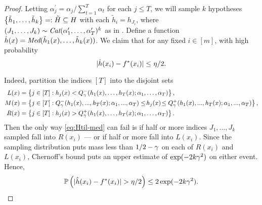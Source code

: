 \begin{proof}
Letting $\alpha_{j}^{\prime} = \alpha_{j} / \sum_{t=1}^{T} \alpha_{t}$ for each $j \leq T$, 
we will sample $k$ hypotheses $\left\{ \tilde h_1,\ldots,\tilde h_k \right\}=:\tilde H\subseteq H$ 
with each $\tilde{h}_{i} = h_{J_{i}}$, where $(J_{1},\ldots,J_{k}) \sim \emph{Cat}(\alpha_{1}^{\prime},\ldots,\alpha_{T}^{\prime})^{k}$ as in .
Define a function $\hat{h}(x) = \emph{Med}(\tilde{h}_{1}(x),\ldots,\tilde{h}_{k}(x))$.  %
We claim that for any fixed $i\in[m]$,
with high probability
\begin{equation}
  \label{eq:Htil-med}
|\hat{h}(x_i)-f^*(x_i)|\le\dev/2.
\end{equation}
\begin{sloppypar}
Indeed,
partition the indices $[T]$ into the disjoint sets
\begin{align*}
L(x) &= \left\{  j \in[ T] : h_{j}(x) < Q_{\gamma}^{-}(h_{1}(x),\ldots,h_{T}(x);\alpha_{1},\ldots,\alpha_{T})  \right\},\\
M(x) &= \left\{  j \in[ T] : Q_{\gamma}^{-}(h_{1}(x),...,h_{T}(x);\alpha_{1},...,\alpha_{T}) \leq\! h_{j}(x) \!\leq Q_{\gamma}^{+}(h_{1}(x),...,h_{T}(x);\alpha_{1},...,\alpha_{T})  \right\},\\
R(x) &= \left\{  j \in[ T] : h_{j}(x) > Q_{\gamma}^{+}(h_{1}(x),\ldots,h_{T}(x);\alpha_{1},\ldots,\alpha_{T})  \right\}.
\end{align*}
Then %
the only way
\eqref{eq:Htil-med}
can fail is if half or more indices %
$J_{1},\ldots,J_{k}$ sampled fall into $R(x_i)$ --- or if half or more fall into $L(x_i)$.
Since the sampling distribution puts mass less than $1/2-\gamma$ 
on each of $R(x_i)$ and $L(x_i)$, 
Chernoff's bound puts an upper estimate of
$\exp(-2k\gamma^2)$ on either event.
Hence,
\begin{equation}
  \label{eq:Htil-med-prob}
  \mathbb{P}\paren{|\hat{h}(x_i)-f^*(x_i)|>\dev/2}
  \le2\exp(-2k\adv^2).
\end{equation}
\end{sloppypar}


\end{proof}
